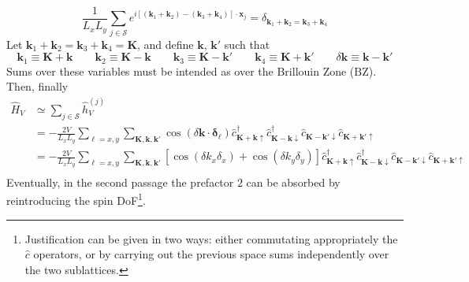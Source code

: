 {\[
	\frac{1}{L_xL_y} \sum_{j \in \mathcal{S}} e^{i \left[ (\mathbf{k}_1 + \mathbf{k}_2) - (\mathbf{k}_3 + \mathbf{k}_4) \right] \cdot \mathbf{x}_j} = \delta_{\mathbf{k}_1 + \mathbf{k}_2 = \mathbf{k}_3 + \mathbf{k}_4}
\]
Let $\mathbf{k}_1 + \mathbf{k}_2 = \mathbf{k}_3 + \mathbf{k}_4 = \mathbf{K}$, and define $\mathbf{k}$, $\mathbf{k}'$ such that
\[
	\mathbf{k}_1 \equiv \mathbf{K} + \mathbf{k} 
	\qquad
	\mathbf{k}_2 \equiv \mathbf{K} - \mathbf{k} 
	\qquad
	\mathbf{k}_3 \equiv \mathbf{K} - \mathbf{k}' 
	\qquad
	\mathbf{k}_4 \equiv \mathbf{K} + \mathbf{k}'
	\qquad
	\delta \mathbf{k} \equiv \mathbf{k}-\mathbf{k}'
\]
Sums over these variables must be intended as over the Brillouin Zone ($\mathrm{BZ}$). Then, finally
\[
\begin{aligned}
	\hat H_V &\simeq \sum_{j \in \mathcal{S}} \hat h_V^{(j)} \\
	&= - \frac{2V}{L_x L_y} \sum_{\ell = x,y} \sum_{\mathbf{K}, \mathbf{k}, \mathbf{k}'} \cos\left(
	\delta \mathbf{k} \cdot \bm{\delta}_\ell
	\right)	\hat c_{\mathbf{K}+\mathbf{k} \uparrow}^\dagger \hat c_{\mathbf{K}-\mathbf{k} \downarrow}^\dagger \hat c_{\mathbf{K}-\mathbf{k}' \downarrow} \hat c_{\mathbf{K}+\mathbf{k}'\uparrow} \\
	&= - \frac{2V}{L_x L_y} \sum_{\ell = x,y} \sum_{\mathbf{K}, \mathbf{k}, \mathbf{k}'} \left[
		\cos \left(
			\delta k_x \delta_x
		\right)	+ \cos \left(
			\delta k_y \delta_y
		\right)	
	\right]	\hat c_{\mathbf{K}+\mathbf{k} \uparrow}^\dagger \hat c_{\mathbf{K}-\mathbf{k} \downarrow}^\dagger \hat c_{\mathbf{K}-\mathbf{k}' \downarrow} \hat c_{\mathbf{K}+\mathbf{k}'\uparrow} \\
\end{aligned}
\]
Eventually, in the second passage the prefactor $2$ can be absorbed by reintroducing the spin DoF\footnote{
	Justification can be given in two ways: either commutating appropriately the $\hat c$ operators, or by carrying out the previous space sums independently over the two sublattices.
}. 

}

